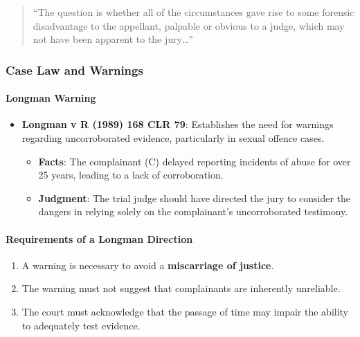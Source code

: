 \begin{quote}
``The question is whether all of the circumstances gave rise to some
forensic disadvantage to the appellant, palpable or obvious to a judge,
which may not have been apparent to the jury\ldots''
\end{quote}

\subsubsection{Case Law and Warnings}\label{case-law-and-warnings}

\paragraph{Longman Warning}\label{longman-warning}

\begin{itemize}
\item
  \textbf{Longman v R (1989) 168 CLR 79}: Establishes the need for
  warnings regarding uncorroborated evidence, particularly in sexual
  offence cases.

  \begin{itemize}
  \item
    \textbf{Facts}: The complainant (C) delayed reporting incidents of
    abuse for over 25 years, leading to a lack of corroboration.
  \item
    \textbf{Judgment}: The trial judge should have directed the jury to
    consider the dangers in relying solely on the complainant's
    uncorroborated testimony.
  \end{itemize}
\end{itemize}

\paragraph{Requirements of a Longman
Direction}\label{requirements-of-a-longman-direction}

\begin{enumerate}
\def\labelenumi{\arabic{enumi}.}
\tightlist
\item
  A warning is necessary to avoid a \textbf{miscarriage of justice}.
\item
  The warning must not suggest that complainants are inherently
  unreliable.
\item
  The court must acknowledge that the passage of time may impair the
  ability to adequately test evidence.
\end{enumerate}

